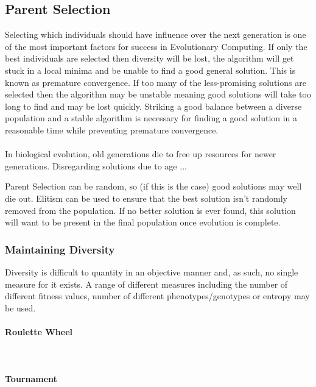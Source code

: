 \documentclass{article}
\newcommand{\myparagraph}[1]{\paragraph{#1}\mbox{}\\}
\begin{document}
\subsection{Parent Selection}
Selecting which individuals should have influence over the next generation is one of the most important factors for success in Evolutionary Computing. If only the best individuals are selected then diversity will be lost, the algorithm will get stuck in a local minima and be unable to find a good general solution. This is known as premature convergence. If too many of the less-promising solutions are selected then the algorithm may be unstable meaning good solutions will take too long to find and may be lost quickly. Striking a good balance between a diverse population and a stable algorithm is necessary for finding a good solution in a reasonable time while preventing premature convergence.
\\\\
In biological evolution, old generations die to free up resources for newer generations.
Disregarding solutions due to age ... %

Parent Selection can be random, so (if this is the case) good solutions may well die out. Elitism can be used to ensure that the best solution isn't randomly removed from the population. If no better solution is ever found, this solution will want to be present in the final population once evolution is complete.


\subsubsection{Maintaining Diversity}
Diversity is difficult to quantity in an objective manner and, as such, no single measure for it exists. A range of different measures including the number of different fitness values, number of different phenotypes/genotypes or entropy may be used\cite{textbook}.

\myparagraph{Roulette Wheel}

\myparagraph{Tournament}
\label{tournament}
\end{document}
